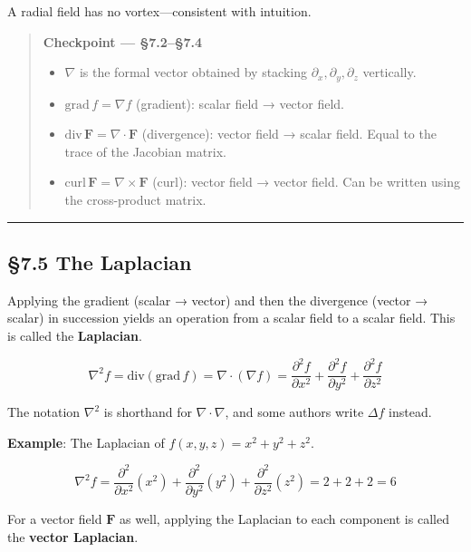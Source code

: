 A radial field has no vortex---consistent with intuition.

\begin{quote}
\textbf{Checkpoint — §7.2–§7.4}

\begin{itemize}
\item
  \(\nabla\) is the formal vector obtained by stacking
  \(\partial_x,\partial_y,\partial_z\) vertically.
\item
  \(\mathrm{grad}\,f = \nabla f\) (gradient): scalar field → vector
  field.
\item
  \(\mathrm{div}\,\mathbf{F} = \nabla \cdot \mathbf{F}\) (divergence):
  vector field → scalar field. Equal to the trace of the Jacobian
  matrix.
\item
  \(\mathrm{curl}\,\mathbf{F} = \nabla \times \mathbf{F}\) (curl):
  vector field → vector field. Can be written using the cross-product
  matrix.
\end{itemize}
\end{quote}

\begin{center}\rule{0.5\linewidth}{0.5pt}\end{center}

\hypertarget{the-laplacian}{%
\subsection{§7.5 The Laplacian}\label{the-laplacian}}

Applying the gradient (scalar → vector) and then the divergence (vector
→ scalar) in succession yields an operation from a scalar field to a
scalar field. This is called the \textbf{Laplacian}.

\[\nabla^2 f = \mathrm{div}(\mathrm{grad}\,f) = \nabla \cdot (\nabla f) = \frac{\partial^2 f}{\partial x^2} + \frac{\partial^2 f}{\partial y^2} + \frac{\partial^2 f}{\partial z^2}\]

The notation \(\nabla^2\) is shorthand for \(\nabla \cdot \nabla\), and
some authors write \(\Delta f\) instead.

\textbf{Example}: The Laplacian of \(f(x,y,z) = x^2 + y^2 + z^2\).

\[\nabla^2 f = \frac{\partial^2}{\partial x^2}(x^2) + \frac{\partial^2}{\partial y^2}(y^2) + \frac{\partial^2}{\partial z^2}(z^2) = 2 + 2 + 2 = 6\]

For a vector field \(\mathbf{F}\) as well, applying the Laplacian to
each component is called the \textbf{vector Laplacian}.

